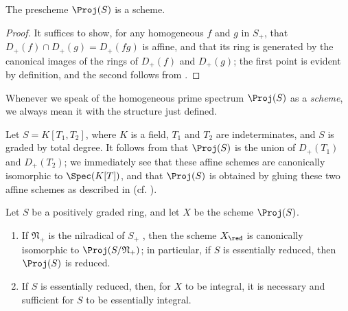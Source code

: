 \begin{proposition}[2.4.2]
\label{II.2.4.2}
The prescheme $\Proj(S)$ is a scheme.
\end{proposition}

\begin{proof}
It suffices  to show, for any homogeneous $f$ and $g$ in $S_+$, that $D_+(f)\cap D_+(g)=D_+(fg)$ is affine, and that its ring is generated by the canonical images of the rings of $D_+(f)$ and $D_+(g)$;
the first point is evident by definition, and the second follows from .
\end{proof}

Whenever we speak of the homogeneous prime spectrum $\Proj(S)$ as a \emph{scheme}, we always mean it with the structure just defined.

\begin{example}[2.4.3]
\label{II.2.4.3}
Let $S=K[T_1,T_2]$, where $K$ is a field, $T_1$ and $T_2$ are indeterminates, and $S$ is graded by total degree.
It follows from  that $\Proj(S)$ is the union of $D_+(T_1)$ and $D_+(T_2)$;
  we immediately see that these affine schemes are canonically isomorphic to $\Spec(K[T])$, and that $\Proj(S)$ is obtained by gluing these two affine schemes as described in  (cf. ).
\end{example}

\begin{proposition}[2.4.4]
\label{II.2.4.4}
Let $S$ be a positively graded ring, and let $X$ be the scheme $\Proj(S)$.
\begin{enumerate}
  \item[{\rm(i)}] If $\mathfrak{N}_+$ is the nilradical of $S_+$ , then the scheme $X_\red$ is canonically isomorphic to $\Proj(S/\mathfrak{N}_+)$;
    in particular, if $S$ is essentially reduced, then $\Proj(S)$ is reduced.
  \item[{\rm(ii)}] If $S$ is essentially reduced, then, for $X$ to be integral, it is necessary and sufficient for $S$ to be essentially integral.
\end{enumerate}
\end{proposition}


